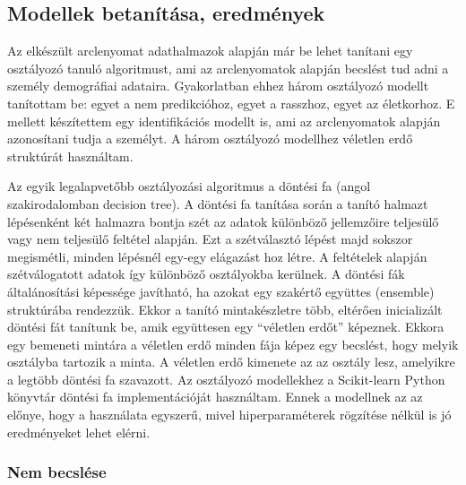 \subsection{Modellek betanítása, eredmények} %


Az elkészült arclenyomat adathalmazok alapján már be lehet tanítani egy osztályozó tanuló algoritmust, ami az arclenyomatok alapján becslést tud adni a személy demográfiai adataira. Gyakorlatban ehhez három osztályozó modellt tanítottam be: egyet a nem predikcióhoz, egyet a rasszhoz, egyet az életkorhoz. E mellett készítettem egy identifikációs modellt is, ami az arclenyomatok alapján azonosítani tudja a személyt. A három osztályozó modellhez véletlen erdő struktúrát használtam.

Az egyik legalapvetőbb osztályozási algoritmus a döntési fa (angol szakirodalomban decision tree). A döntési fa tanítása során a tanító halmazt lépésenként két halmazra bontja szét az adatok különböző jellemzőire teljesülő vagy nem teljesülő feltétel alapján. Ezt a szétválasztó lépést majd sokszor megismétli, minden lépésnél egy-egy elágazást hoz létre. A feltételek alapján szétválogatott adatok így különböző osztályokba kerülnek. A döntési fák általánosítási képessége javítható, ha azokat egy szakértő együttes (ensemble) struktúrába rendezzük. Ekkor a tanító mintakészletre több, eltérően inicializált döntési fát tanítunk be, amik együttesen egy ``véletlen erdőt'' képeznek. Ekkora egy bemeneti mintára a véletlen erdő minden fája képez egy becslést, hogy melyik osztályba tartozik a minta. A véletlen erdő kimenete az az osztály lesz, amelyikre a legtöbb döntési fa szavazott. Az osztályozó modellekhez a Scikit-learn Python könyvtár döntési fa implementációját használtam. Ennek a modellnek az az előnye, hogy a használata egyszerű, mivel hiperparaméterek rögzítése nélkül is jó eredményeket lehet elérni.

\subsubsection*{Nem becslése}

